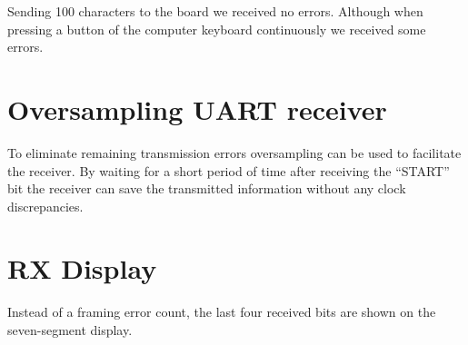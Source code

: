 



Sending 100 characters to the board we received no errors. Although when pressing a button of the computer keyboard continuously we received some errors.


\section{Oversampling UART receiver}

To eliminate remaining transmission errors oversampling can be used to facilitate the receiver. By waiting for a short period of time after receiving the ``START'' bit the receiver can save the transmitted information without any clock discrepancies.







\section{RX Display}

Instead of a framing error count, the last four received bits are shown on the seven-segment display.

